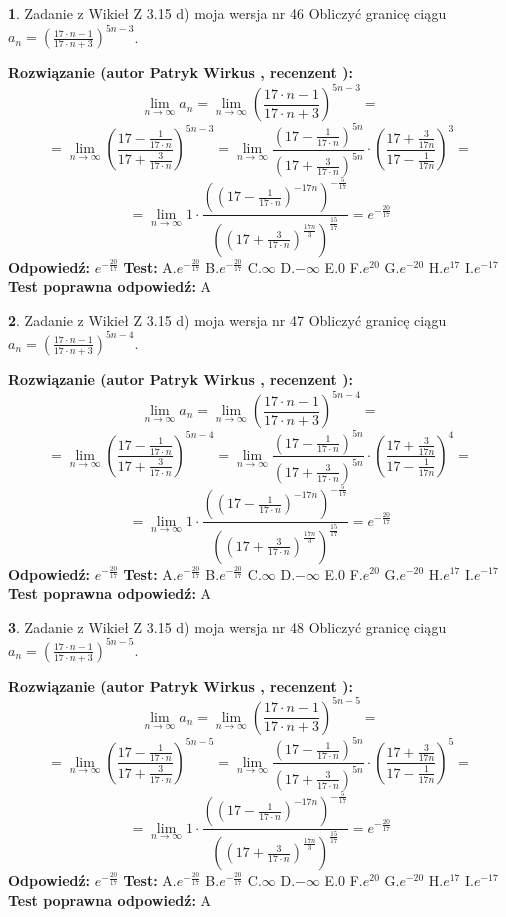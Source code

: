 \documentclass[12pt, a4paper]{article}
\theoremstyle{definition} %
\newtheorem{zad}{}
\newcommand{\zadStart}[1]{\begin{zad}#1\newline}
\newcommand{\zadStop}{\end{zad}}
\newcommand{\rozwStart}[2]{\noindent \textbf{Rozwiązanie (autor #1 , recenzent #2): }\newline}
\newcommand{\rozwStop}{\newline}
\newcommand{\odpStart}{\noindent \textbf{Odpowiedź:}\newline}
\newcommand{\odpStop}{\newline}
\newcommand{\testStart}{\noindent \textbf{Test:}\newline}
\newcommand{\testStop}{\newline}
\newcommand{\kluczStart}{\noindent \textbf{Test poprawna odpowiedź:}\newline}
\newcommand{\kluczStop}{\newline}
\begin{document}
\zadStart{Zadanie z Wikieł Z 3.15 d) moja wersja nr 46}
Obliczyć granicę ciągu $a_{n}=(\frac{17\cdot n - 1}{17 \cdot n + 3})^{5n-3}$.
\zadStop
\rozwStart{Patryk Wirkus}{}
$$\lim\limits_{n\to\infty} a_{n} = \lim\limits_{n\to\infty}(\frac{17\cdot n - 1}{17 \cdot n + 3})^{5n-3}=$$
$$=\lim\limits_{n\to\infty}(\frac{17 - \frac{1}{17\cdot n}}{17 + \frac{3}{17 \cdot n}})^{5n-3}=\lim\limits_{n\to\infty}\frac{(17 - \frac{1}{17\cdot n})^{5n}}{(17 + \frac{3}{17\cdot n})^{5n}} \cdot (\frac{17+\frac{3}{17n}}{17-\frac{1}{17n}})^{3}=$$
$$=\lim\limits_{n\to\infty} 1 \cdot \frac{((17-\frac{1}{17 \cdot n})^{-17n})^{-\frac{5}{17}}}{((17+\frac{3}{17 \cdot n})^{\frac{17n}{3}})^{\frac{15}{17}}} =e^{-\frac{20}{17}}$$
\rozwStop
\odpStart
$e^{-\frac{20}{17}}$
\odpStop
\testStart
A.$ e^{-\frac{20}{17}}$
B.$ e^{-\frac{20}{17}}$
C.$\infty$
D.$-\infty$
E.$0$
F.$e^{20}$
G.$e^{-20}$
H.$e^{17}$
I.$e^{-17}$
\testStop
\kluczStart
A
\kluczStop



\zadStart{Zadanie z Wikieł Z 3.15 d) moja wersja nr 47}
Obliczyć granicę ciągu $a_{n}=(\frac{17\cdot n - 1}{17 \cdot n + 3})^{5n-4}$.
\zadStop
\rozwStart{Patryk Wirkus}{}
$$\lim\limits_{n\to\infty} a_{n} = \lim\limits_{n\to\infty}(\frac{17\cdot n - 1}{17 \cdot n + 3})^{5n-4}=$$
$$=\lim\limits_{n\to\infty}(\frac{17 - \frac{1}{17\cdot n}}{17 + \frac{3}{17 \cdot n}})^{5n-4}=\lim\limits_{n\to\infty}\frac{(17 - \frac{1}{17\cdot n})^{5n}}{(17 + \frac{3}{17\cdot n})^{5n}} \cdot (\frac{17+\frac{3}{17n}}{17-\frac{1}{17n}})^{4}=$$
$$=\lim\limits_{n\to\infty} 1 \cdot \frac{((17-\frac{1}{17 \cdot n})^{-17n})^{-\frac{5}{17}}}{((17+\frac{3}{17 \cdot n})^{\frac{17n}{3}})^{\frac{15}{17}}} =e^{-\frac{20}{17}}$$
\rozwStop
\odpStart
$e^{-\frac{20}{17}}$
\odpStop
\testStart
A.$ e^{-\frac{20}{17}}$
B.$ e^{-\frac{20}{17}}$
C.$\infty$
D.$-\infty$
E.$0$
F.$e^{20}$
G.$e^{-20}$
H.$e^{17}$
I.$e^{-17}$
\testStop
\kluczStart
A
\kluczStop



\zadStart{Zadanie z Wikieł Z 3.15 d) moja wersja nr 48}
Obliczyć granicę ciągu $a_{n}=(\frac{17\cdot n - 1}{17 \cdot n + 3})^{5n-5}$.
\zadStop
\rozwStart{Patryk Wirkus}{}
$$\lim\limits_{n\to\infty} a_{n} = \lim\limits_{n\to\infty}(\frac{17\cdot n - 1}{17 \cdot n + 3})^{5n-5}=$$
$$=\lim\limits_{n\to\infty}(\frac{17 - \frac{1}{17\cdot n}}{17 + \frac{3}{17 \cdot n}})^{5n-5}=\lim\limits_{n\to\infty}\frac{(17 - \frac{1}{17\cdot n})^{5n}}{(17 + \frac{3}{17\cdot n})^{5n}} \cdot (\frac{17+\frac{3}{17n}}{17-\frac{1}{17n}})^{5}=$$
$$=\lim\limits_{n\to\infty} 1 \cdot \frac{((17-\frac{1}{17 \cdot n})^{-17n})^{-\frac{5}{17}}}{((17+\frac{3}{17 \cdot n})^{\frac{17n}{3}})^{\frac{15}{17}}} =e^{-\frac{20}{17}}$$
\rozwStop
\odpStart
$e^{-\frac{20}{17}}$
\odpStop
\testStart
A.$ e^{-\frac{20}{17}}$
B.$ e^{-\frac{20}{17}}$
C.$\infty$
D.$-\infty$
E.$0$
F.$e^{20}$
G.$e^{-20}$
H.$e^{17}$
I.$e^{-17}$
\testStop
\kluczStart
A
\kluczStop
\end{document}
